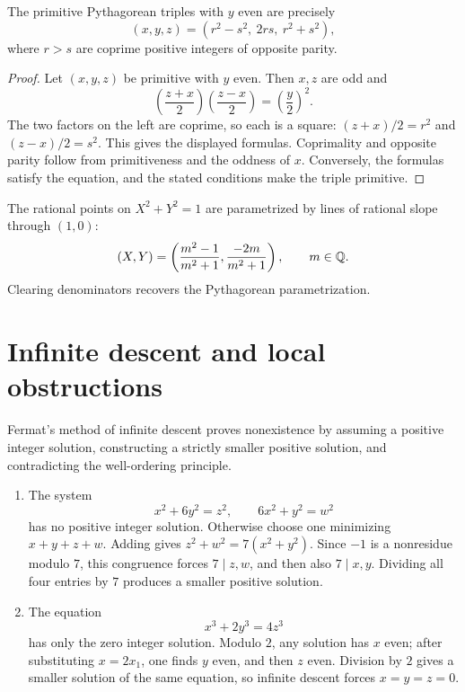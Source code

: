 \begin{thm}
The primitive Pythagorean triples with $y$ even are precisely
\[
 (x,y,z)=(r^2-s^2,\ 2rs,\ r^2+s^2),
\]
where $r>s$ are coprime positive integers of opposite parity.
\end{thm}
\begin{proof}
Let $(x,y,z)$ be primitive with $y$ even.  Then $x,z$ are odd and
\[
 \left(\frac{z+x}{2}\right)
 \left(\frac{z-x}{2}\right)
 =\left(\frac y2\right)^2.
\]
The two factors on the left are coprime, so each is a square:
$(z+x)/2=r^2$ and $(z-x)/2=s^2$.  This gives the displayed formulas.  Coprimality and opposite parity follow from primitiveness and the oddness of $x$.  Conversely, the formulas satisfy the equation, and the stated conditions make the triple primitive.
\end{proof}

\begin{remark}
The rational points on $X^2+Y^2=1$ are parametrized by lines of rational slope through $(1,0)$:
\[
 (X,Y)=\left(\frac{m^2-1}{m^2+1},\frac{-2m}{m^2+1}\right),
 \qquad m\in\mathbb{Q}.
\]
Clearing denominators recovers the Pythagorean parametrization.
\end{remark}

\section{Infinite descent and local obstructions}

\begin{de}
Fermat's method of infinite descent proves nonexistence by assuming a positive integer solution, constructing a strictly smaller positive solution, and contradicting the well-ordering principle.
\end{de}

\begin{app}
\begin{enumerate}[label=(\alph*)]
\item The system
\[
 x^2+6y^2=z^2,
 \qquad
 6x^2+y^2=w^2
\]
has no positive integer solution.  Otherwise choose one minimizing $x+y+z+w$.  Adding gives
$z^2+w^2=7(x^2+y^2)$.  Since $-1$ is a nonresidue modulo $7$, this congruence forces $7\mid z,w$, and then also $7\mid x,y$.  Dividing all four entries by $7$ produces a smaller positive solution.

\item The equation
\[
 x^3+2y^3=4z^3
\]
has only the zero integer solution.  Modulo $2$, any solution has $x$ even; after substituting $x=2x_1$, one finds $y$ even, and then $z$ even.  Division by $2$ gives a smaller solution of the same equation, so infinite descent forces $x=y=z=0$.
\end{enumerate}
\end{app}

